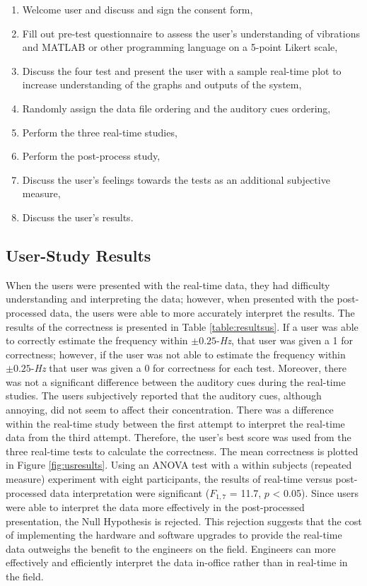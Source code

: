 \documentclass{sigchi}
\begin{document}
\begin{enumerate}
    \item Welcome user and discuss and sign the consent form,
    \item Fill out pre-test questionnaire to assess the user's understanding of vibrations and MATLAB or other programming language on a 5-point Likert scale,
    \item Discuss the four test and present the user with a sample real-time plot to increase understanding of the graphs and outputs of the system,
    \item Randomly assign the data file ordering and the auditory cues ordering,
    \item Perform the three real-time studies,
    \item Perform the post-process study,
    \item Discuss the user's feelings towards the tests as an additional subjective measure,
    \item Discuss the user's results.
\end{enumerate}

\subsection{User-Study Results}

When the users were presented with the real-time data, they had difficulty understanding and interpreting the data; however, when presented with the post-processed data, the users were able to more accurately interpret the results. The results of the correctness is presented in Table \ref{table:resultsus}. If a user was able to correctly estimate the frequency within $\pm0.25$-\textit{Hz}, that user was given a 1 for correctness; however, if the user was not able to estimate the frequency within $\pm0.25$-\textit{Hz} that user was given a 0 for correctness for each test. Moreover, there was not a significant difference between the auditory cues during the real-time studies. The users subjectively reported that the auditory cues, although annoying, did not seem to affect their concentration. There was a difference within the real-time study between the first attempt to interpret the real-time data from the third attempt. Therefore, the user's best score was used from the three real-time tests to calculate the correctness. The mean correctness is plotted in Figure \ref{fig:usresults}. Using an ANOVA test with a within subjects (repeated measure) experiment with eight participants, the results of real-time versus post-processed data interpretation were significant ($F_{1,7}$ = 11.7, $p$ < 0.05). Since users were able to interpret the data more effectively in the post-processed presentation, the Null Hypothesis is rejected. This rejection suggests that the cost of implementing the hardware and software upgrades to provide the real-time data outweighs the benefit to the engineers on the field. Engineers can more effectively and efficiently interpret the data in-office rather than in real-time in the field.
\end{document}
